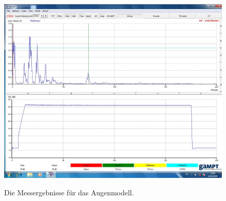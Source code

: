 \begin{figure}
	\centering
	\caption{Die Messergebnisse für das Augenmodell.}
	\includegraphics[width=\linewidth-70pt,height=\textheight-70pt,keepaspectratio]{content/images/AUGE.jpg}
	\label{fig:Auge}
\end{figure}